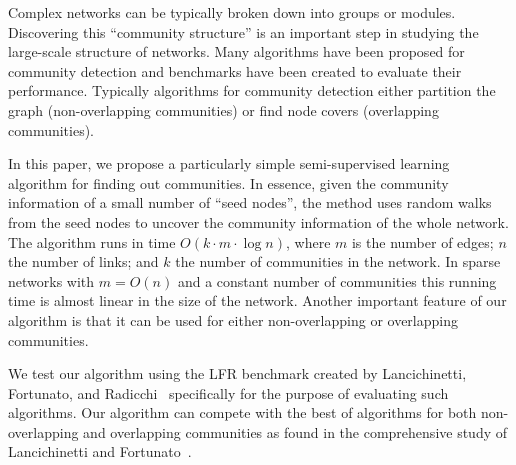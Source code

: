 Complex networks can be typically broken down into groups or modules. Discovering 
this ``community structure'' is an important step in studying the large-scale 
structure of networks. Many algorithms have been proposed for community detection 
and benchmarks have been created to evaluate their performance. Typically algorithms 
for community detection either partition the graph (non-overlapping 
communities) or find node covers (overlapping communities). 

In this paper, we propose a particularly simple semi-supervised learning 
algorithm for finding out communities. In essence, given the community information of a small 
number of ``seed nodes'', the method uses random walks from the seed nodes 
to uncover the community information of the whole network. The algorithm runs 
in time $O(k \cdot m \cdot \log n)$, where $m$ is the number of edges; $n$ 
the number of links; and $k$ the number of communities in the network. 
In sparse networks with $m = O(n)$ and a constant number of communities this 
running time is almost linear in the size of the network. Another important 
feature of our algorithm is that it can be used for either non-overlapping 
or overlapping communities. 

We test our algorithm using the LFR benchmark created by Lancichinetti, 
Fortunato, and Radicchi~\cite{LFR08} 
specifically for the purpose of evaluating such algorithms. Our algorithm 
can compete with the best of algorithms for both non-overlapping 
and overlapping communities as found in the comprehensive study of 
Lancichinetti and Fortunato~\cite{LF09}.
